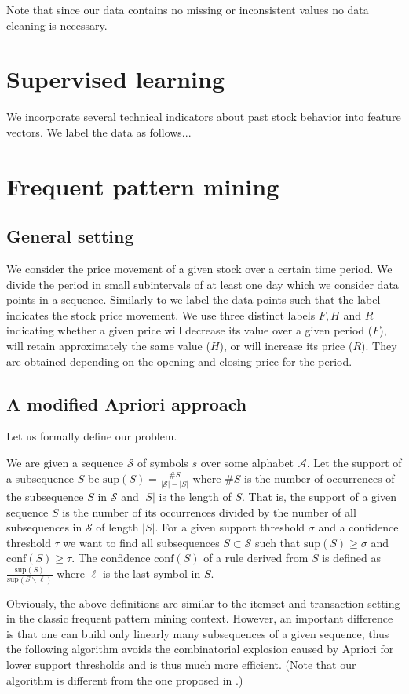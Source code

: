\documentclass{llncs}
\begin{document}
Note that since our data contains no missing or inconsistent values no data cleaning is necessary.  
\section*{Supervised learning}
We incorporate several technical indicators about past stock behavior into feature vectors. We label the data as follows...
 
\section*{Frequent pattern mining}
\subsection*{General setting}
We consider the price movement of a given stock over a certain time period. We divide the period in small subintervals of at least one day which we consider data points in a sequence.  
Similarly to \cite{fpstock} we label the data points such that the label indicates the stock price movement. We use three distinct labels $F, H$ and $R$ indicating whether a given price will decrease its value over a given period ($F$), will retain approximately the same value ($H$), or will increase its price ($R$). They are obtained depending on the opening and closing price for the period. 
\subsection*{A modified Apriori approach}
Let us formally define our problem.

We are given a sequence $\mathcal{S}$ of symbols $s$ over some alphabet $\mathcal{A}$. Let the support of a subsequence $S$ be $\mbox{sup}(S) = \frac{\#S}{|\mathcal{S}| - |S|}$ where $\#S$ is the number of occurrences of the subsequence $S$ in $\mathcal{S}$ and $|S|$ is the length of  $S$. That is, the support of a given sequence $S$ is the number of its occurrences divided by the number of all subsequences in $\mathcal{S}$ of length $|S|$.  For a given support threshold $\sigma$ and a confidence threshold $\tau$ we want to find all subsequences $S \subset \mathcal{S}$ such that $\mbox{sup}(S) \geq \sigma$ and $\mbox{conf}(S) \geq \tau$. The confidence $\mbox{conf}(S)$ of a rule derived from $S$ is defined as $\frac{\mbox{sup}(S)}{\mbox{sup}(S\backslash\ell)}$ where $\ell$ is the last symbol in $S$.

Obviously, the above definitions are similar to the itemset and transaction setting in the classic frequent pattern mining context. However, an important difference is that one can build only linearly many subsequences of a given sequence, thus the following algorithm avoids the combinatorial explosion caused by Apriori for lower support thresholds and is thus much more efficient. (Note that our algorithm is different from the one proposed in \cite{fpstock}.)
\end{document}
